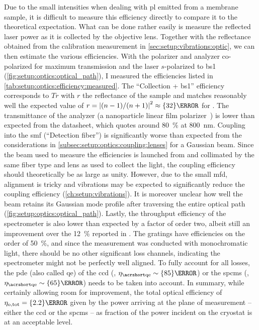 Due to the small intensities when dealing with \gls{pl} emitted from a membrane sample, it is difficult to measure this efficiency directly to compare it to the theoretical expectation.
What can be done rather easily is measure the reflected laser power as it is collected by the objective lens.
Together with the reflectance obtained from the calibration measurement in \cref{sec:setup:vibrations:optic}, we can then estimate the various efficiencies.
With the polarizer and analyzer co-polarized for maximum transmission and the laser $s$-polarized \wrt to \gls{bs}1 (\cf \cref{fig:setup:optics:optical_path}), I measured the efficiencies listed in \cref{tab:setup:optics:efficiency:measured}.
The \enquote{Collection + \gls{bs}1} efficiency corresponds to $Tr$ with $r$ the reflectance of the sample and matches reasonably well the expected value of $r=\abs{(n-1)/(n+1)}^2\approx\qty{32}{\percent}$ for .
The transmittance of the analyzer (a nanoparticle linear film polarizer~\cite{ThorlabsLPVIS050-MP2}) is lower than expected from the datasheet, which quotes around \qty{80}{\percent} at \qty{800}{\nano\meter}.
Coupling into the \gls{smf} (\enquote{Detection fiber}) is significantly worse than expected from the considerations in \cref{subsec:setup:optics:coupling:lenses} for a Gaussian beam.
Since the beam used to measure the efficiencies is launched from and collimated by the same fiber type and lens as used to collect the light, the coupling efficiency should theoretically be as large as unity.
However, due to the small \gls{mfd}, alignment is tricky and vibrations may be expected to significantly reduce the coupling efficiency (\cf \cref{ch:setup:vibrations}).
It is moreover unclear how well the beam retains its Gaussian  mode profile after traversing the entire optical path (\cf \cref{fig:setup:optics:optical_path}).
Lastly, the throughput efficiency of the spectrometer is also lower than expected by a factor of order two, albeit still an improvement over the \qty{12}{\percent} reported in .
The gratings have efficiencies on the order of \qty{50}{\percent}, and since the measurement was conducted with monochromatic light, there should be no other significant loss channels, indicating the spectrometer might not be perfectly well aligned.
To fully account for all losses, the \gls{pde} (also called \gls{qe}) of the \gls{ccd} (\theccd, $\eta_{\QE}\sim\qty{85}{\percent}$) or the \glspl{spcm} (\thespcm, $\eta_{\QE}\sim\qty{65}{\percent}$) needs to be taken into account.
In summary, while certainly allowing room for improvement, the total optical efficiency of $\eta_{\mr{o,tot}} = \qty{2.2}{\percent}$ given by the power arriving at the plane of measurement -- either the \gls{ccd} or the \glspl{spcm} -- as fraction of the power incident on the cryostat is at an acceptable level.

